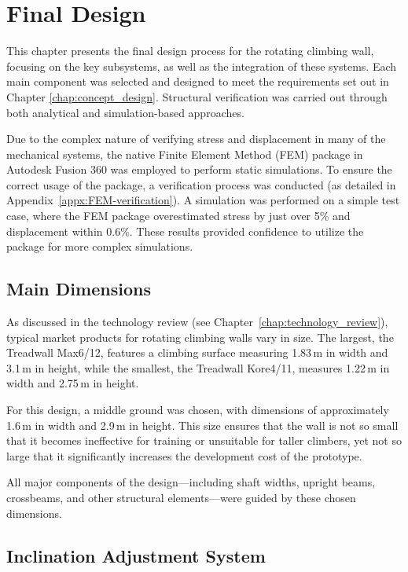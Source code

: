 \chapter{Final Design}
\label{chap:detailed_design}

This chapter presents the final design process for the rotating climbing wall, focusing on the key subsystems, as well as the integration of these systems. Each main component was selected and designed to meet the requirements set out in Chapter \ref{chap:concept_design}. Structural verification was carried out through both analytical and simulation-based approaches.

Due to the complex nature of verifying stress and displacement in many of the mechanical systems, the native Finite Element Method (FEM) package in Autodesk Fusion 360 was employed to perform static simulations. To ensure the correct usage of the package, a verification process was conducted (as detailed in Appendix~\ref{appx:FEM-verification}). A simulation was performed on a simple test case, where the FEM package overestimated stress by just over 5\% and displacement within 0.6\%. These results provided confidence to utilize the package for more complex simulations.

\section{Main Dimensions}

As discussed in the technology review (see Chapter~\ref{chap:technology_review}), typical market products for rotating climbing walls vary in size. The largest, the Treadwall Max6/12, features a climbing surface measuring 1.83\,m in width and 3.1\,m in height, while the smallest, the Treadwall Kore4/11, measures 1.22\,m in width and 2.75\,m in height.

For this design, a middle ground was chosen, with dimensions of approximately 1.6\,m in width and 2.9\,m in height. This size ensures that the wall is not so small that it becomes ineffective for training or unsuitable for taller climbers, yet not so large that it significantly increases the development cost of the prototype.

All major components of the design—including shaft widths, upright beams, crossbeams, and other structural elements—were guided by these chosen dimensions.

\section{Inclination Adjustment System}

